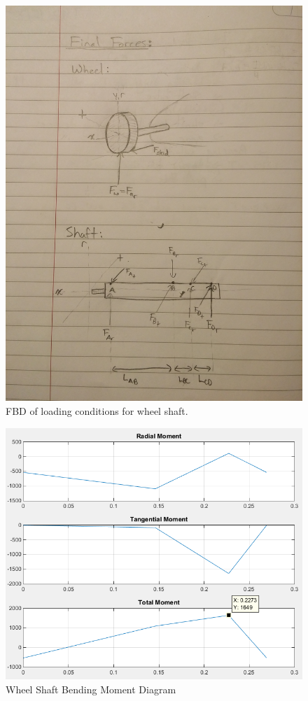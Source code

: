 \begin{figure}[H]
	\centering
	\includegraphics[width=\textwidth]{dom/loading_conditions_calc.jpg}
	\caption{FBD of loading conditions for wheel shaft.}
	\label{fig:fbd_wheelshaft}
\end{figure}

\begin{figure}[H]
\centering
\includegraphics[width=\textwidth]{images/wheelshaft_bmd}
\caption{Wheel Shaft Bending Moment Diagram}
\label{fig:wheel_shaft_bmd}
\end{figure}


